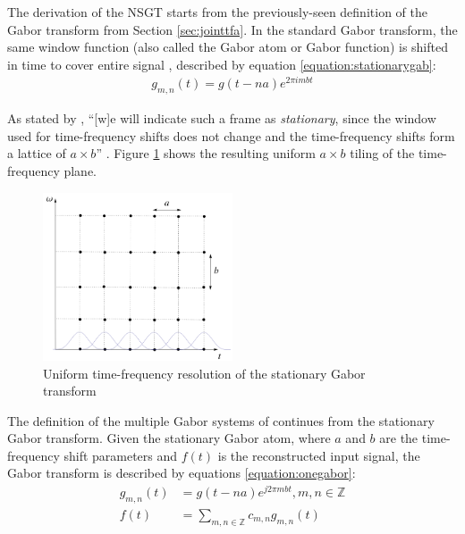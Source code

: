 \documentclass[report.tex]{subfiles}
\begin{document}
The derivation of the NSGT starts from the previously-seen definition of the Gabor transform from Section \ref{sec:jointtfa}. In the standard Gabor transform, the same window function (also called the Gabor atom or Gabor function) is shifted in time to cover entire signal \parencite{adaptivecqt}, described by equation \eqref{equation:stationarygab}:
\begin{align} \tag{11}\label{equation:stationarygab}
g_{m, n}(t) = g(t - na)e^{2\pi i m b t}
\end{align}

As stated by \citeauthor{adaptivecqt}, ``[w]e will indicate such a frame as \textit{stationary}, since the window used for time-frequency shifts does not change and the time-frequency shifts form a lattice of $a \times b$'' \parencite[3]{adaptivecqt}. Figure \ref{fig:uniformtflattice} shows the resulting uniform $a \times b$ tiling of the time-frequency plane.

\begin{figure}[ht]
	\centering
	\includegraphics[width=0.5\textwidth]{./images-tftheory/stationarygabor.png}
	\caption{Uniform time-frequency resolution of the stationary Gabor transform \parencite[3]{adaptivecqt}}
	\label{fig:uniformtflattice}
\end{figure}

The definition of the multiple Gabor systems of \textcite{doerflerphd} continues from the stationary Gabor transform. Given the stationary Gabor atom, where $a$ and $b$ are the time-frequency shift parameters and $f(t)$ is the reconstructed input signal, the Gabor transform is described by equations \eqref{equation:onegabor}:
\begin{align}
	\nonumber g_{m,n}(t) &= g(t - na)e^{j2\pi m b t}, m,n \in \mathbb{Z}\\
	\nonumber f(t) &= \sum_{m,n \in \mathbb{Z}}c_{m,n}g_{m,n}(t) \tag{12}\label{equation:onegabor}
\end{align}
\end{document}
